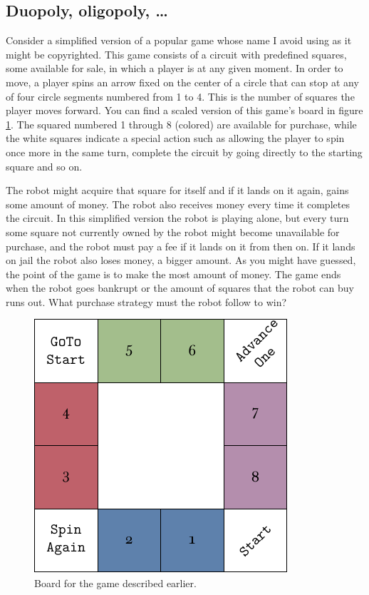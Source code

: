 \subsection{Duopoly, oligopoly, \ldots}
Consider a simplified version of a popular game whose name I 
avoid using as it might be copyrighted. This game consists of a 
circuit with predefined squares, some available for sale, in 
which a player is at any given moment. In order to move, a 
player spins an arrow fixed on the center of a circle that can 
stop at any of four circle segments numbered from 1 to 4. This 
is the number of squares the player moves forward. You can find 
a scaled version of this game's board in figure 
\ref{fig:miniopoly-board}. The squared numbered 1 through 8 
(colored) are available for purchase, while the white squares 
indicate a special action such as allowing the player to spin 
once more in the same turn, complete the circuit by going 
directly to the starting square and so on.

The robot might acquire that square for itself and if it lands 
on it again, gains some amount of money. The robot also 
receives money every time it completes the circuit. In this 
simplified version the robot is playing alone, but every turn 
some square not currently owned by the robot might become 
unavailable for purchase, and the robot must pay a fee if it 
lands on it from then on. If it lands on jail the robot also 
loses money, a bigger amount. As you might have guessed, the 
point of the game is to make the most amount of money. The game 
ends when the robot goes bankrupt or the amount of squares that 
the robot can buy runs out. What purchase strategy must the 
robot follow to win?
\begin{figure}[H]
	\centering
	\includegraphics[width=.75\textwidth]{img/board.pdf}
	\caption{Board for the game described earlier.}
	\label{fig:miniopoly-board}
\end{figure}

